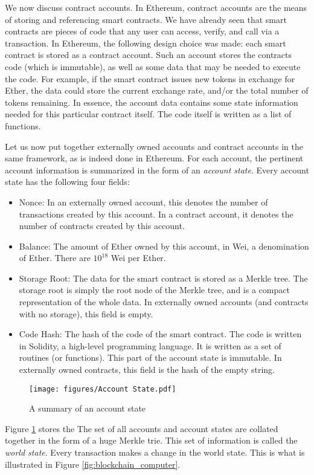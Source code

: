 \documentclass{article}
\begin{document}
We now discuss contract accounts. In Ethereum, contract accounts are the means of storing and referencing smart contracts. We have already seen that smart contracts are pieces of code that any user can access, verify, and call via a transaction. In Ethereum, the following design choice was made: each smart contract is stored as a contract account. Such an account stores the contracts code (which is immutable), as well as some data that may be needed to execute the code. For example, if the smart contract issues new tokens in exchange for Ether, the data could store the current exchange rate, and/or the total number of tokens remaining. In essence, the account data contains some state information needed for this particular contract itself. The code itself is written as a list of functions.

Let us now put together externally owned accounts and contract accounts in the same framework, as is indeed done in Ethereum. For each account, the pertinent account information is summarized in the form of an \textit{account state}. Every account state has the following four fields:
\begin{itemize}
    \item Nonce: In an externally owned account, this denotes the number of transactions created by this account. In a contract account, it denotes the number of contracts created by this account.
    \item Balance: The amount of Ether owned by this account, in Wei, a denomination of Ether. There are $10^{18}$ Wei per Ether.
    \item Storage Root: The data for the smart contract is stored as a Merkle tree. The storage root is simply the root node of the Merkle tree, and is a compact representation of the whole data. In externally owned accounts (and contracts with no storage), this field is empty.
    \item Code Hash: The hash of the code of the smart contract. The code is written in Solidity, a high-level programming language. It is written as a set of routines (or functions). This part of the account state is immutable. In externally owned contracts, this field is the hash of the empty string.
\end{itemize}

\begin{figure}
    \centering
    \texttt{[image: figures/Account State.pdf]}
    \caption{A summary of an account state}
    \label{fig:account_state}
\end{figure}
Figure \ref{fig:account_state} stores the  
The set of all accounts and account states are collated together in the form of a huge Merkle trie. This set of information is called the \textit{world state}. Every transaction makes a change in the world state. This is what is illustrated in Figure \ref{fig:blockchain_computer}.
\end{document}
